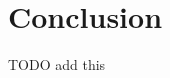 \documentclass{acm_proc_article-sp}
\begin{document}
\section{Conclusion}
TODO add this


%
\nocite{*}


\end{document}
